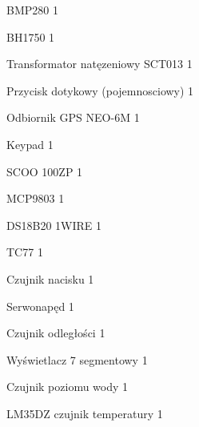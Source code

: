 \documentclass[11pt, a4paper]{article}
\begin{document}
BMP280 
\hfill
1

BH1750 
\hfill
1

Transformator natęzeniowy SCT013
\hfill
1

Przycisk dotykowy (pojemnosciowy)
\hfill
1

Odbiornik GPS NEO-6M
\hfill
1

Keypad
\hfill
1

SCOO 100ZP
\hfill
1

MCP9803
\hfill
1

DS18B20 1WIRE
\hfill
1

TC77
\hfill
1

Czujnik nacisku
\hfill
1

Serwonapęd
\hfill
1

\newpage

Czujnik odległości
\hfill
1

Wyświetlacz 7 segmentowy 
\hfill
1

Czujnik poziomu wody 
\hfill
1

LM35DZ czujnik temperatury
\hfill
1
\end{document}
